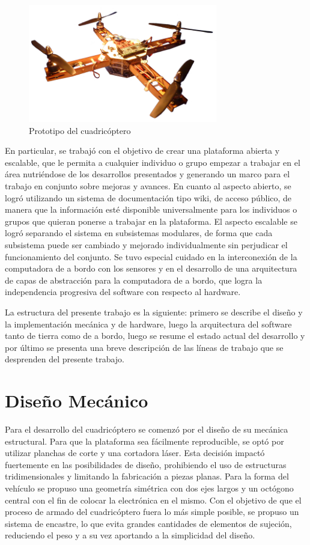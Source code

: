 \documentclass[a4paper, conference]{IEEEtran}
\begin{document}
\begin{figure}[!t]
\centering
\includegraphics[width=3.25in]{foto_quad.png}
\caption{Prototipo del cuadricóptero}
\label{ref:quadfoto}
\end{figure}

En particular, se trabajó con el objetivo de crear una plataforma abierta y escalable, que le permita a cualquier individuo o grupo empezar a trabajar en el área nutriéndose de los desarrollos presentados y generando un marco para el trabajo en conjunto sobre mejoras y avances. En cuanto al aspecto abierto, se logró utilizando un sistema de documentación tipo wiki, de acceso público, de manera que la información esté disponible universalmente para los individuos o grupos que quieran ponerse a trabajar en la plataforma. El aspecto escalable se logró separando el sistema en subsistemas modulares, de forma que cada subsistema puede ser cambiado y mejorado individualmente sin perjudicar el funcionamiento del conjunto. Se tuvo especial cuidado en la interconexión de la computadora de a bordo con los sensores y en el desarrollo de una arquitectura de capas de abstracción para la computadora de a bordo, que logra la independencia progresiva del software con respecto al hardware. 

La estructura del presente trabajo es la siguiente: primero se describe el diseño y la implementación mecánica y de hardware, luego la arquitectura del software tanto de tierra como de a bordo, luego se resume el estado actual del desarrollo y por último se presenta una breve descripción de las líneas de trabajo que se desprenden del presente trabajo.


\section{Diseño Mecánico}

Para el desarrollo del cuadricóptero se comenzó por el diseño de su mecánica estructural. Para que la plataforma sea fácilmente reproducible, se optó por utilizar planchas de corte y una cortadora láser. Esta decisión impactó fuertemente en las posibilidades de diseño, prohibiendo el uso de estructuras tridimensionales y limitando la fabricación a piezas planas. Para la forma del vehículo se propuso una geometría simétrica con dos ejes largos y un octógono central con el fin de colocar la electrónica en el mismo. Con el objetivo de que el proceso de armado del cuadricóptero fuera lo más simple posible, se propuso un sistema de encastre, lo que evita grandes cantidades de elementos de sujeción, reduciendo el peso y a su vez aportando a la simplicidad del diseño. 
\end{document}
